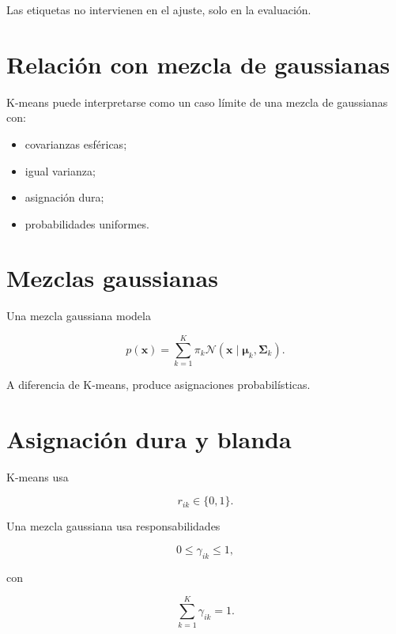 \documentclass[
  spanish,
  10.5pt,
  letterpaper,
  DIV=11,
  numbers=noendperiod,
  oneside,
  open=any]{scrreprt}
\providecommand{\tightlist}{%
  \setlength{\itemsep}{0pt}\setlength{\parskip}{0pt}}
\theoremstyle{definition}
\theoremstyle{definition}
\theoremstyle{plain}
\theoremstyle{remark}
\begin{document}
Las etiquetas no intervienen en el ajuste, solo en la evaluación.

\section*{Relación con mezcla de
gaussianas}\label{relaciuxf3n-con-mezcla-de-gaussianas}


K-means puede interpretarse como un caso límite de una mezcla de
gaussianas con:

\begin{itemize}
\tightlist
\item
  covarianzas esféricas;
\item
  igual varianza;
\item
  asignación dura;
\item
  probabilidades uniformes.
\end{itemize}

\section*{Mezclas gaussianas}\label{mezclas-gaussianas}


Una mezcla gaussiana modela

\[
p(\mathbf{x})
=
\sum_{k=1}^{K}
\pi_k
\mathcal{N}
\left(
\mathbf{x}
\mid
\boldsymbol{\mu}_k,
\boldsymbol{\Sigma}_k
\right).
\]

A diferencia de K-means, produce asignaciones probabilísticas.

\section*{Asignación dura y blanda}\label{asignaciuxf3n-dura-y-blanda}


K-means usa

\[
r_{ik}\in\{0,1\}.
\]

Una mezcla gaussiana usa responsabilidades

\[
0\leq\gamma_{ik}\leq 1,
\]

con

\[
\sum_{k=1}^{K}\gamma_{ik}=1.
\]
\end{document}
